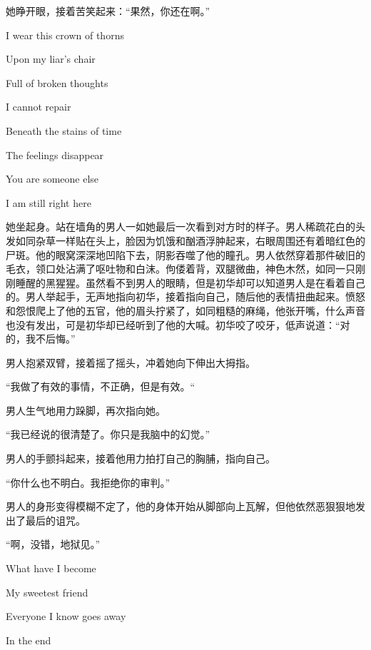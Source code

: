 \documentclass{article}
\begin{document}
她睁开眼，接着苦笑起来：“果然，你还在啊。”



I wear this crown of thorns

Upon my liar's chair

Full of broken thoughts

I cannot repair

Beneath the stains of time

The feelings disappear

You are someone else

I am still right here



她坐起身。站在墙角的男人一如她最后一次看到对方时的样子。男人稀疏花白的头发如同杂草一样贴在头上，脸因为饥饿和酗酒浮肿起来，右眼周围还有着暗红色的尸斑。他的眼窝深深地凹陷下去，阴影吞噬了他的瞳孔。男人依然穿着那件破旧的毛衣，领口处沾满了呕吐物和白沫。佝偻着背，双腿微曲，神色木然，如同一只刚刚睡醒的黑猩猩。虽然看不到男人的眼睛，但是初华却可以知道男人是在看着自己的。男人举起手，无声地指向初华，接着指向自己，随后他的表情扭曲起来。愤怒和怨恨爬上了他的五官，他的眉头拧紧了，如同粗糙的麻绳，他张开嘴，什么声音也没有发出，可是初华却已经听到了他的大喊。初华咬了咬牙，低声说道：“对的，我不后悔。”



男人抱紧双臂，接着摇了摇头，冲着她向下伸出大拇指。



“我做了有效的事情，不正确，但是有效。“



男人生气地用力跺脚，再次指向她。



“我已经说的很清楚了。你只是我脑中的幻觉。”



男人的手颤抖起来，接着他用力拍打自己的胸脯，指向自己。



“你什么也不明白。我拒绝你的审判。”



男人的身形变得模糊不定了，他的身体开始从脚部向上瓦解，但他依然恶狠狠地发出了最后的诅咒。



“啊，没错，地狱见。”



What have I become

My sweetest friend

Everyone I know goes away

In the end
\end{document}
